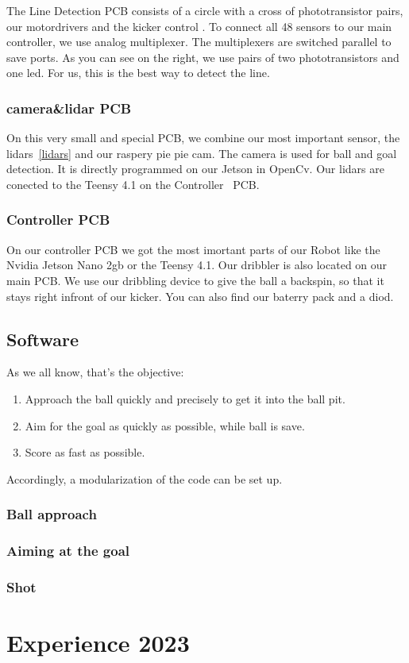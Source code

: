 \documentclass{scrartcl}
\begin{document}
The Line Detection PCB consists of a circle with a cross of phototransistor pairs, our motordrivers and the kicker control . To connect all
48 sensors to our main controller, we use analog multiplexer. The multiplexers are switched parallel
to save ports.
\newline
As you can see on the right, we use pairs of two phototransistors and one led. For us, this is the 
best way to detect the line.

\subsubsection*{camera\&lidar PCB}
On this very small and special PCB, we combine our most important sensor, the lidars~\ref{lidars} and our raspery pie 
pie cam. The camera is used for ball and goal detection. It is directly programmed on our Jetson in OpenCv.
Our lidars are conected to the Teensy 4.1 on the Controller~\label{PCB:Controller} PCB.

\subsubsection{Controller PCB}

On our controller PCB we got the most imortant parts of our Robot like the Nvidia Jetson Nano 2gb 
or the Teensy 4.1. Our dribbler is also located on our main PCB. We use our dribbling device
to give the ball a backspin, so that it stays right infront of our kicker. You can also find our baterry pack 
and a diod. 

 \subsection{Software} %
 As we all know, that's the objective:
 \begin{enumerate}
     \item{Approach the ball quickly and precisely to get it into the ball pit.}
     \item{Aim for the goal as quickly as possible, while ball is save.}
     \item{Score as fast as possible.}
 \end{enumerate}
 Accordingly, a modularization of the code can be set up.
 \subsubsection{Ball approach}
 
 \subsubsection{Aiming at the goal}
 
 \subsubsection{Shot}
 
 \section{Experience 2023}
 
\end{document}
